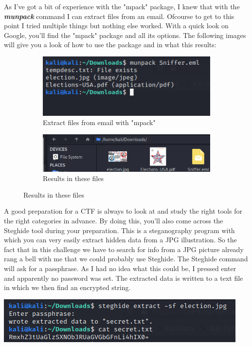 \documentclass[../main.tex]{subfiles}
\begin{document}
\pagebreak
As I've got a bit of experience with the "mpack" package, I knew that with the \textbf{\textit{munpack}} command I can extract files from an email. Ofcourse to get to this point I tried multiple things but nothing else worked. With a quick look on Google, you'll find the "mpack" package and all its options. The following images will give you a look of how to use the package and in what this results:
\begin{figure}[h]
\begin{subfigure}{0.5\textwidth}
\includegraphics[width=1\linewidth]{images/Robbe/sniffer_writeup3.png}
\caption{Extract files from email with "mpack"}
\end{subfigure}
\begin{subfigure}{0.5\textwidth}
\includegraphics[width=1\linewidth]{images/Robbe/sniffer_writeup3b.png}
\caption{Results in these files}
\end{subfigure}
\end{figure}

 A good preparation for a CTF is always to look at and study the right tools for the right categories in advance. By doing this, you'll also come across the Steghide tool during your preparation. This is a steganography program with which you can very easily extract hidden data from a JPG illustration. So the fact that in this challenge we have to search for info from a JPG picture already rang a bell with me that we could probably use Steghide. The Steghide command will ask for a passphrase. As I had no idea what this could be, I pressed enter and apparently no password was set. The extracted data is written to a text file in which we then find an encrypted string. 

 \begin{center}
    \includegraphics[width=1\linewidth]{images/Robbe/sniffer_writeup6.png}
\end{center}
\end{document}
